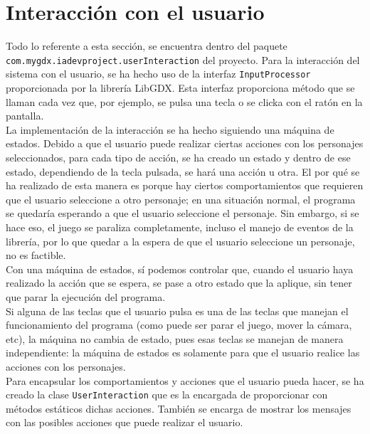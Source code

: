 \medskip
\section{Interacción con el usuario}
\label{interaccion}
Todo lo referente a esta sección, se encuentra dentro del paquete \texttt{com.mygdx.iadevproject.userInteraction} del proyecto. Para la interacción del sistema con el usuario, se ha hecho uso de la interfaz \texttt{InputProcessor} proporcionada por la librería LibGDX. Esta interfaz proporciona método que se llaman cada vez que, por ejemplo, se pulsa una tecla o se clicka con el ratón en la pantalla. \\

La implementación de la interacción se ha hecho siguiendo una máquina de estados. Debido a que el usuario puede realizar ciertas acciones con los personajes seleccionados, para cada tipo de acción, se ha creado un estado y dentro de ese estado, dependiendo de la tecla pulsada, se hará una acción u otra. El por qué se ha realizado de esta manera es porque hay ciertos comportamientos que requieren que el usuario seleccione a otro personaje; en una situación normal, el programa se quedaría esperando a que el usuario seleccione el personaje. Sin embargo, si se hace eso, el juego se paraliza completamente, incluso el manejo de eventos de la librería, por lo que quedar a la espera de que el usuario seleccione un personaje, no es factible. \\

Con una máquina de estados, sí podemos controlar que, cuando el usuario haya realizado la acción que se espera, se pase a otro estado que la aplique, sin tener que parar la ejecución del programa. \\

Si alguna de las teclas que el usuario pulsa es una de las teclas que manejan el funcionamiento del programa (como puede ser parar el juego, mover la cámara, etc), la máquina no cambia de estado, pues esas teclas se manejan de manera independiente: la máquina de estados es solamente para que el usuario realice las acciones con los personajes. \\

Para encapsular los comportamientos y acciones que el usuario pueda hacer, se ha creado la clase \texttt{UserInteraction} que es la encargada de proporcionar con métodos estáticos dichas acciones. También se encarga de mostrar los mensajes con las posibles acciones que puede realizar el usuario.